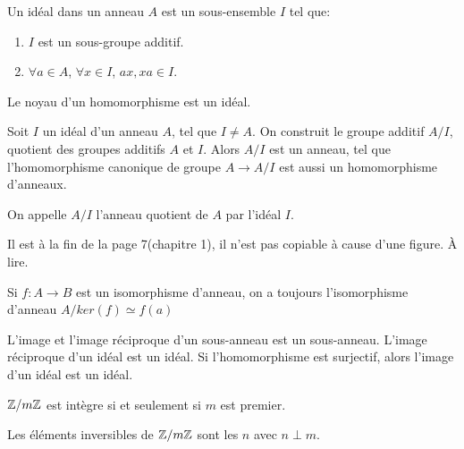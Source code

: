 \documentclass[12pt,a4paper]{article}
\begin{document}
\begin{flushleft}
\begin{mydef}
Un idéal dans un anneau $A$ est un sous-ensemble $I$ tel que:
\begin{enumerate}
\item $I$ est un sous-groupe additif.
\item $\forall a \in A$, $\forall x \in I$, $ax, xa \in I$.
\end{enumerate}
\end{mydef}

\begin{prop}
Le noyau d'un homomorphisme est un idéal.
\end{prop}

\begin{prop}
Soit $I$ un idéal d'un anneau $A$, tel que $I \neq A$. On construit le groupe additif $A/I$, quotient des groupes additifs $A$ et $I$. Alors $A/I$ est un anneau, tel que l'homomorphisme canonique de groupe $A \longrightarrow A/I$ est aussi un homomorphisme d'anneaux.
\end{prop}

\begin{mydef}
On appelle $A/I$ l'anneau quotient de $A$ par l'idéal $I$.
\end{mydef}

\begin{thm}
Il est à la fin de la page 7(chapitre 1), il n'est pas copiable à cause d'une figure. À lire.
\end{thm}

\begin{cor}
Si $f: A\longrightarrow B$ est un isomorphisme d'anneau, on a toujours l'isomorphisme d'anneau $A/ker(f) \simeq f(a)$
\end{cor}

\begin{prop}
L'image et l'image réciproque d'un sous-anneau est un sous-anneau. L'image réciproque d'un idéal est un idéal. Si l'homomorphisme est surjectif, alors l'image d'un idéal est un idéal.
\end{prop}

\begin{prop} 
$\mathbb{Z} / m \mathbb{Z}$ est intègre si et seulement si $m$ est premier.
\end{prop}

\begin{prop}
Les éléments inversibles de $\mathbb{Z} / m \mathbb{Z}$ sont les $n$ avec $ n \perp m$. 
\end{prop}

\begin{cor}

\end{cor}



\end{flushleft}


 
\end{document}
